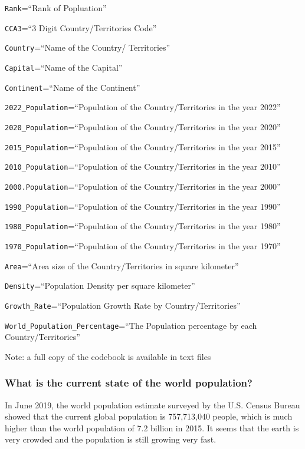 \documentclass[
]{article}
\begin{document}
\texttt{Rank}=``Rank of Popluation''

\texttt{CCA3}=``3 Digit Country/Territories Code''

\texttt{Country}=``Name of the Country/ Territories''

\texttt{Capital}=``Name of the Capital''

\texttt{Continent}=``Name of the Continent''

\texttt{2022\_Population}=``Population of the Country/Territories in the
year 2022''

\texttt{2020\_Population}=``Population of the Country/Territories in the
year 2020''

\texttt{2015\_Population}=``Population of the Country/Territories in the
year 2015''

\texttt{2010\_Population}=``Population of the Country/Territories in the
year 2010''

\texttt{2000.Population}=``Population of the Country/Territories in the
year 2000''

\texttt{1990\_Population}=``Population of the Country/Territories in the
year 1990''

\texttt{1980\_Population}=``Population of the Country/Territories in the
year 1980''

\texttt{1970\_Population}=``Population of the Country/Territories in the
year 1970''

\texttt{Area}=``Area size of the Country/Territories in square
kilometer''

\texttt{Density}=``Population Density per square kilometer''

\texttt{Growth\_Rate}=``Population Growth Rate by Country/Territories''

\texttt{World\_Population\_Percentage}=``The Population percentage by
each Country/Territories''

Note: a full copy of the codebook is available in text files

\hypertarget{what-is-the-current-state-of-the-world-population}{%
\subsubsection{What is the current state of the world
population?}\label{what-is-the-current-state-of-the-world-population}}

In June 2019, the world population estimate surveyed by the U.S. Census
Bureau showed that the current global population is 757,713,040 people,
which is much higher than the world population of 7.2 billion in 2015.
It seems that the earth is very crowded and the population is still
growing very fast.
\end{document}
